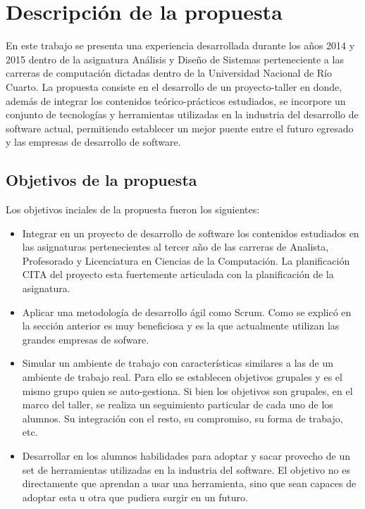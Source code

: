 \section{Descripción de la propuesta} \label{propuesta}

En este trabajo se presenta una experiencia desarrollada durante los años 2014 y 2015 dentro de la asignatura Análisis y Diseño de
Sistemas perteneciente a las carreras de computación dictadas dentro de la Universidad Nacional de Río Cuarto.
La propuesta consiste 
en el desarrollo de un proyecto-taller en donde, además de integrar los contenidos teórico-prácticos 
estudiados, se incorpore un conjunto de tecnologías y herramientas utilizadas en la industria del desarrollo de software actual,
permitiendo
establecer un mejor
puente entre el futuro egresado y las empresas de desarrollo de software. \\


\subsection{Objetivos de la propuesta}
Los objetivos inciales de la propuesta fueron los siguientes:
 \begin{itemize}
 \item Integrar en un  proyecto de desarrollo de software los contenidos estudiados en las asignaturas pertenecientes al tercer 
   año de las carreras de Analista, Profesorado y  Licenciatura en Ciencias de la Computación. La planificación CITA del proyecto esta 
   fuertemente articulada con la planificación de la asignatura.
 \item Aplicar una metodología de desarrollo ágil como Scrum. Como se explicó en la sección anterior es muy beneficiosa y es la que actualmente utilizan las grandes empresas de sofware.
 \item Simular un ambiente de trabajo con características similares a las de un ambiente de trabajo real. Para ello se establecen objetivos grupales y es el mismo grupo quien se auto-gestiona. Si bien los objetivos son grupales, en el marco del taller, se realiza un seguimiento particular de cada uno de los alumnos. Su integración con el resto, su compromiso, su forma de trabajo, etc.
 \item Desarrollar en los alumnos habilidades para adoptar y sacar provecho de un set de herramientas utilizadas en la industria del software. El objetivo no es directamente que aprendan a usar una herramienta, sino que sean capaces de adoptar esta u otra que pudiera surgir en un futuro.
 
 \end{itemize}
 
